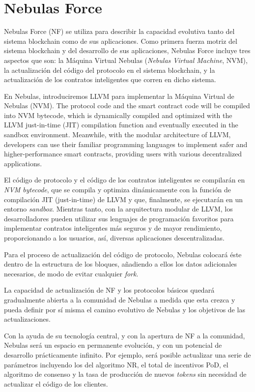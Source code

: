 \section{Nebulas Force}
\label{sec:nebulasforce}

Nebulas Force (NF) se utiliza para describir la capacidad evolutiva tanto del sistema blockchain como de sus aplicaciones. Como primera fuerza motriz del sistema blockchain y del desarrollo de sus aplicaciones, Nebulas Force incluye tres aspectos que son: la Máquina Virtual Nebulas (\textit{Nebulas Virtual Machine}, NVM), la actualización del código del protocolo en el sistema blockchain, y la actualización de los contratos inteligentes que corren en dicho sistema.

En Nebulas, introduciremos LLVM para implementar la Máquina Virtual de Nebulas (NVM). The protocol code and the smart contract code will be compiled into NVM bytecode, which is dynamically compiled and optimized with the LLVM just-in-time (JIT) compilation function and eventually executed in the sandbox environment. Meanwhile, with the modular architecture of LLVM, developers can use their familiar programming languages to implement safer and higher-performance smart contracts, providing users with various decentralized applications.

El código de protocolo y el código de los contratos inteligentes se compilarán en \textit{NVM bytecode}, que se compila y optimiza dinámicamente con la función de compilación JIT (just-in-time) de LLVM y que, finalmente, se ejecutarán en un entorno \textit{sandbox}. Mientras tanto, con la arquitectura modular de LLVM, los desarrolladores pueden utilizar sus lenguajes de programación favoritos para implementar contratos inteligentes más seguros y de mayor rendimiento, proporcionando a los usuarios, así, diversas aplicaciones descentralizadas.

Para el proceso de actualización del código de protocolo, Nebulas colocará éste dentro de la estructura de los bloques, añadiendo a ellos los datos adicionales necesarios, de modo de evitar cualquier \textit{fork}.

La capacidad de actualización de NF y los protocolos básicos quedará gradualmente abierta a la comunidad de Nebulas a medida que esta crezca y pueda definir por sí misma el camino evolutivo de Nebulas y los objetivos de las actualizaciones.

Con la ayuda de su tecnología central, y con la apertura de NF a la comunidad, Nebulas será un espacio en permanente evolución, y con un potencial de desarrollo prácticamente infinito. Por ejemplo, será posible actualizar una serie de parámetros incluyendo los del algoritmo NR, el total de incentivos PoD, el algoritmo de consenso y la tasa de producción de nuevos \textit{tokens} sin necesidad de actualizar el código de los clientes.

